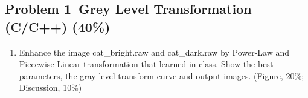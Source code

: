 	\begin{reportsection}{-1cm}{-1cm}
		\section*{Problem 1~Grey Level Transformation (C/C++) (40\%)}
		\begin{enumerate}[label=\alph*.]
			\item 
      Enhance the image cat\_bright.raw and cat\_dark.raw by Power-Law and Piecewise-Linear 
      transformation that learned in class. Show the best parameters, the gray-level 
      transform curve and output images. (Figure, 20\%; Discussion, 10\%)

\end{enumerate}
\end{reportsection}

